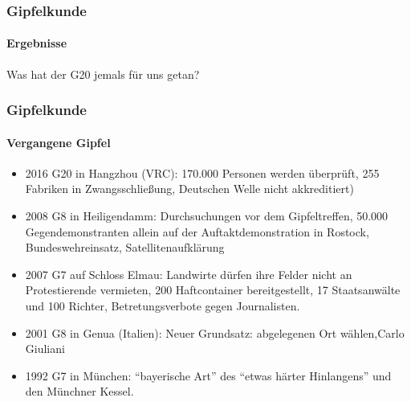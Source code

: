 \documentclass[]{beamer}
\begin{document}
	\begin{frame}
	\frametitle{Gipfelkunde}  \framesubtitle{Ergebnisse}
	Was hat der G20 jemals für uns getan?
	\end{frame}

	\begin{frame}
		\frametitle{Gipfelkunde}  \framesubtitle{Vergangene Gipfel}
		\begin{itemize}
			\item 2016 G20 in Hangzhou (VRC): 170.000 Personen werden überprüft, 255 Fabriken in Zwangsschließung, Deutschen Welle nicht akkreditiert)
			\item 2008 G8 in Heiligendamm: Durchsuchungen vor dem Gipfeltreffen, 50.000 Gegendemonstranten allein auf der Auftaktdemonstration in Rostock, Bundeswehreinsatz, Satellitenaufklärung
			\item 2007 G7 auf Schloss Elmau: Landwirte dürfen ihre Felder nicht an Protestierende vermieten, 200 Haftcontainer bereitgestellt, 17 Staatsanwälte und 100 Richter, Betretungsverbote gegen Journalisten.
			\item 2001 G8 in Genua (Italien): Neuer Grundsatz: abgelegenen Ort wählen,Carlo Giuliani
			\item 1992 G7 in München: \enquote{bayerische Art} des \enquote{etwas härter Hinlangens} und den Münchner Kessel. 
		\end{itemize}
\end{frame}
\end{document}
